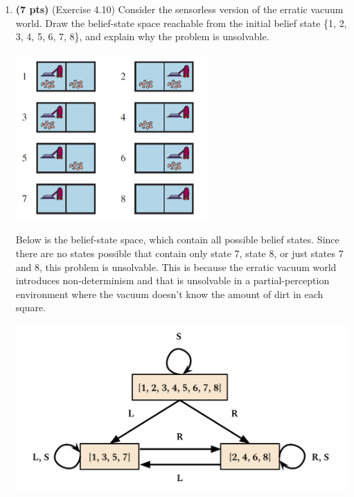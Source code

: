 \documentclass{article}
\begin{document}
\begin{enumerate}
\begin{enumerate}[label=($\alph*$)]

    \end{enumerate}



\item \textbf{(7 pts)} (Exercise 4.10) Consider the sensorless version of the erratic vacuum world. Draw the belief-state space reachable from the initial belief state \{1, 2, 3, 4, 5, 6, 7, 8\}, and explain why the problem is unsolvable.

\begin{center}
    \includegraphics[scale=0.75]{472-PS3-Q3.png}
\end{center}

\color{blue}
    Below is the belief-state space, which contain all possible belief states. Since there are no states possible that contain only state 7, state 8, or just states 7 and 8, this problem is unsolvable. This is because the erratic vacuum world introduces non-determinism and that is unsolvable in a partial-perception environment where the vacuum doesn't know the amount of dirt in each square.
\color{black}

\begin{center}
    \includegraphics[scale=0.75]{472-PS3-Q3-answer.png}
\end{center}


\end{enumerate}
\end{document}
